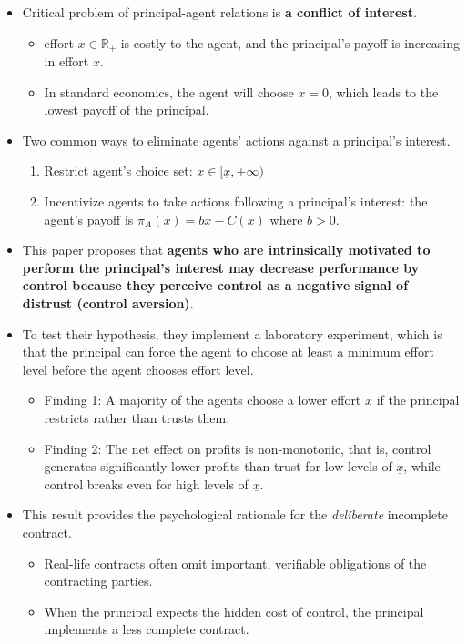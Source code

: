 \documentclass[../root]{subfiles}
\begin{document}
    \begin{itemize}
        \item Critical problem of principal-agent relations is \textbf{a conflict of interest}.
        \begin{itemize}
            \item effort $x \in \mathbb{R}_+$ is costly to the agent, and the principal's payoff is increasing in effort $x$.
            \item In standard economics, the agent will choose $x = 0$, which leads to the lowest payoff of the principal.
        \end{itemize}
        \item Two common ways to eliminate agents' actions against a principal's interest.
        \begin{enumerate}
            \item Restrict agent's choice set: $x \in [\underline{x}, +\infty)$
            \item Incentivize agents to take actions following a principal's interest: the agent's payoff is $\pi_A(x) = bx - C(x)$ where $b > 0$.
        \end{enumerate}
        \item This paper proposes that \textbf{agents who are intrinsically motivated to perform the principal's interest may decrease performance by control because they perceive control as a negative signal of distrust (control aversion)}.
        \item To test their hypothesis, they implement a laboratory experiment, which is that the principal can force the agent to choose at least a minimum effort level before the agent chooses effort level.
        \begin{itemize}
            \item Finding 1: A majority of the agents choose a lower effort $x$ if the principal restricts rather than trusts them.
            \item Finding 2: The net effect on profits is non-monotonic, that is, control generates significantly lower profits than trust for low levels of $\underline{x}$, while control breaks even for high levels of $\underline{x}$. 
        \end{itemize} 
        \item This result provides the psychological rationale for the \textit{deliberate} incomplete contract.
        \begin{itemize}
            \item Real-life contracts often omit important, verifiable obligations of the contracting parties.
            \item When the principal expects the hidden cost of control, the principal implements a less complete contract.
        \end{itemize}
    \end{itemize}
    
\end{document}
